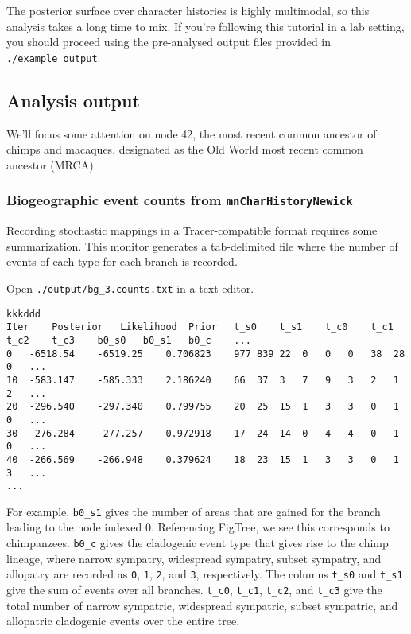 The posterior surface over character histories is highly multimodal, so this analysis takes a long time to mix.
If you're following this tutorial in a lab setting, you should proceed using the pre-analysed output files provided in {\tt ./example\_output}.





\subsection{Analysis output}
\label{sec:bg_out}

We'll focus some attention on node 42, the most recent common ancestor of chimps and macaques, designated as the Old World most recent common ancestor (MRCA).

\subsubsection{Biogeographic event counts from {\tt mnCharHistoryNewick}}

Recording stochastic mappings in a Tracer-compatible format requires some summarization.
This monitor generates a tab-delimited file where the number of events of each type for each branch is recorded.

Open {\tt ./output/bg\_3.counts.txt} in a text editor.

\begin{framed}
\begin{lstlisting}[style=textboxSmall]  % \listingsfont, columns=texcl]
kkkddd
Iter	Posterior	Likelihood	Prior	t_s0	t_s1	t_c0	t_c1	t_c2	t_c3	b0_s0	b0_s1	b0_c	...
0	-6518.54	-6519.25	0.706823	977	839	22	0	0	0	38	28	0	...
10	-583.147	-585.333	2.186240	66	37	3	7	9	3	2	1	2	...
20	-296.540	-297.340	0.799755	20	25	15	1	3	3	0	1	0	...
30	-276.284	-277.257	0.972918	17	24	14	0	4	4	0	1	0	...
40	-266.569	-266.948	0.379624	18	23	15	1	3	3	0	1	3	...
...
\end{lstlisting}
\end{framed}

For example, {\tt b0\_s1} gives the number of areas that are gained for the branch leading to the node indexed 0.
Referencing FigTree, we see this corresponds to chimpanzees.
{\tt b0\_c} gives the cladogenic event type that gives rise to the chimp lineage, where narrow sympatry, widespread sympatry, subset sympatry, and allopatry are recorded as {\tt 0}, {\tt 1}, {\tt 2}, and {\tt 3}, respectively. The columns {\tt t\_s0} and {\tt t\_s1} give the sum of events over all branches. {\tt t\_c0}, {\tt t\_c1}, {\tt t\_c2}, and {\tt t\_c3} give the total number of narrow sympatric, widespread sympatric, subset sympatric, and allopatric cladogenic events over the entire tree.

